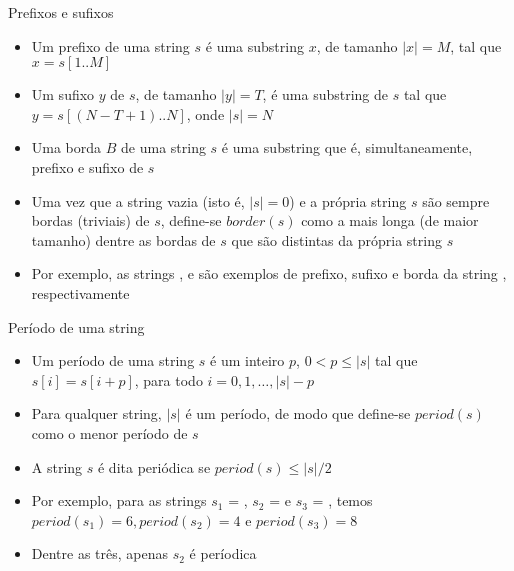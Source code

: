 \begin{frame}[fragile]{Prefixos e sufixos}

    \begin{itemize}
        \item Um prefixo de uma string $s$ é uma substring $x$, de tamanho $|x| = M$, tal que 
            $x = s[1..M]$
        \pause

        \item Um sufixo $y$ de $s$, de tamanho $|y| = T$, é uma substring de $s$ tal que 
            $y = s[(N - T + 1)..N]$, onde $|s| = N$

        \pause

        \item Uma borda $B$ de uma string $s$ é uma substring que é, simultaneamente, prefixo e 
            sufixo de $s$
        \pause

        \item Uma vez que a string vazia (isto é, $|s| = 0$) e a própria string $s$ são sempre 
            bordas (triviais) de $s$, define-se $border(s)$ como a mais longa 
            (de maior tamanho) dentre as bordas de $s$ que são distintas da própria string $s$
        \pause

        \item Por exemplo, as strings ,  e  são exemplos 
            de prefixo, sufixo e borda da string , respectivamente
    \end{itemize}

\end{frame}


\begin{frame}[fragile]{Período de uma string}

    \begin{itemize}

        \item Um período de uma string $s$ é um inteiro $p$, $0 < p \leq |s|$ tal que 
            $s[i] = s[i + p]$, para todo $i = {0, 1, \ldots, |s| - p}$
        \pause

        \item Para qualquer string, $|s|$ é um período, de modo que define-se 
            $period(s)$ como o menor período de $s$
        \pause

        \item A string $s$ é dita periódica se $period(s) \leq |s|/2$
        \pause

        \item Por exemplo, para as strings $s_1$ = , 
            $s_2$ =  e $s_3$ = , temos 
            $period(s_1) = 6, period(s_2) = 4$ e $period(s_3) = 8$
        \pause

        \item Dentre as três, apenas $s_2$ é períodica
    \end{itemize}

\end{frame}

